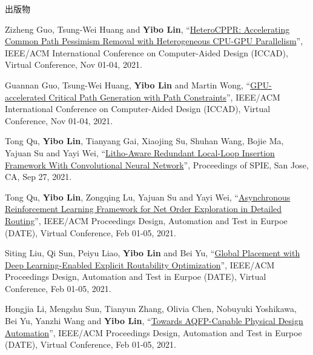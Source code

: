 \begin{rSection}{出版物}
\begin{description}[font=\normalfont, rightmargin=2em]
{}
            

\item[{[C50]}]{
        Zizheng Guo, Tsung-Wei Huang and \textbf{Yibo Lin}, 
    ``\href{https://doi.org/10.1109/ICCAD51958.2021.9643457}{HeteroCPPR: Accelerating Common Path Pessimism Removal with Heterogeneous CPU-GPU Parallelism}'', 
    IEEE/ACM International Conference on Computer-Aided Design (ICCAD), Virtual Conference, Nov 01-04, 2021.
    
}
            

\item[{[C49]}]{
        Guannan Guo, Tsung-Wei Huang, \textbf{Yibo Lin} and Martin Wong, 
    ``\href{https://doi.org/10.1109/ICCAD51958.2021.9643504}{GPU-accelerated Critical Path Generation with Path Constraints}'', 
    IEEE/ACM International Conference on Computer-Aided Design (ICCAD), Virtual Conference, Nov 01-04, 2021.
    
}
            

\item[{[C48]}]{
        Tong Qu, \textbf{Yibo Lin}, Tianyang Gai, Xiaojing Su, Shuhan Wang, Bojie Ma, Yajuan Su and Yayi Wei, 
    ``\href{https://doi.org/10.1117/12.2601685}{Litho-Aware Redundant Local-Loop Insertion Framework With Convolutional Neural Network}'', 
    Proceedings of SPIE, San Jose, CA, Sep 27, 2021.
    
}
            

\item[{[C47]}]{
        Tong Qu, \textbf{Yibo Lin}, Zongqing Lu, Yajuan Su and Yayi Wei, 
    ``\href{https://doi.org/10.23919/DATE51398.2021.9474007}{Asynchronous Reinforcement Learning Framework for Net Order Exploration in Detailed Routing}'', 
    IEEE/ACM Proceedings Design, Automation and Test in Eurpoe (DATE), Virtual Conference, Feb 01-05, 2021.
    
}
            

\item[{[C46]}]{
        Siting Liu, Qi Sun, Peiyu Liao, \textbf{Yibo Lin} and Bei Yu, 
    ``\href{https://doi.org/10.23919/DATE51398.2021.9473959}{Global Placement with Deep Learning-Enabled Explicit Routability Optimization}'', 
    IEEE/ACM Proceedings Design, Automation and Test in Eurpoe (DATE), Virtual Conference, Feb 01-05, 2021.
    
}
            

\item[{[C45]}]{
        Hongjia Li, Mengshu Sun, Tianyun Zhang, Olivia Chen, Nobuyuki Yoshikawa, Bei Yu, Yanzhi Wang and \textbf{Yibo Lin}, 
    ``\href{https://doi.org/10.23919/DATE51398.2021.9474259}{Towards AQFP-Capable Physical Design Automation}'', 
    IEEE/ACM Proceedings Design, Automation and Test in Eurpoe (DATE), Virtual Conference, Feb 01-05, 2021.
    
}
\end{description}
\end{rSection}
